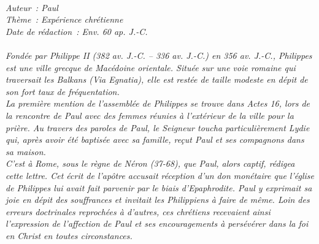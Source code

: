 \BFont
\noindent\hrulefill
{\footnotesize
\textit{
\bigskip
{\centering{}
\\Auteur~: Paul
\\Thème~: Expérience chrétienne
\\Date de rédaction~: Env. 60 ap. J.-C.\\}
}
\textit{
\\Fondée par Philippe II (382 av. J.-C. – 336 av. J.-C.) en 356 av. J.-C., Philippes est une ville grecque de Macédoine orientale. Située sur une voie romaine qui traversait les Balkans (Via Egnatia), elle est restée de taille modeste en dépit de son fort taux de fréquentation.
\\La première mention de l'assemblée de Philippes se trouve dans Actes 16, lors de la rencontre de Paul avec des femmes réunies à l'extérieur de la ville pour la prière. Au travers des paroles de Paul, le Seigneur toucha particulièrement Lydie qui, après avoir été baptisée avec sa famille, reçut Paul et ses compagnons dans sa maison.
\\C'est à Rome, sous le règne de Néron (37-68), que Paul, alors captif, rédigea cette lettre. Cet écrit de l'apôtre accusait réception d'un don monétaire que l'église de Philippes lui avait fait parvenir par le biais d'Epaphrodite. Paul y exprimait sa joie en dépit des souffrances et invitait les Philippiens à faire de même. Loin des erreurs doctrinales reprochées à d'autres, ces chrétiens recevaient ainsi l'expression de l'affection de Paul et ses encouragements à persévérer dans la foi en Christ en toutes circonstances.\bigskip
}
}
\par\nobreak\noindent\hrulefill
